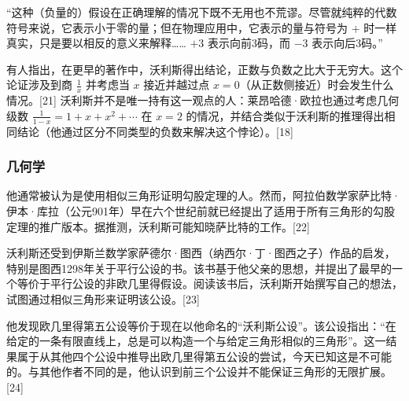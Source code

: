“这种（负量的）假设在正确理解的情况下既不无用也不荒谬。尽管就纯粹的代数符号来说，它表示小于零的量；但在物理应用中，它表示的量与符号为 \(+\) 时一样真实，只是要以相反的意义来解释…… \(+3\) 表示向前3码，而 \(-3\) 表示向后3码。”

有人指出，在更早的著作中，沃利斯得出结论，正数与负数之比大于无穷大。这个论证涉及到商 \(\frac{1}{x}\) 并考虑当 \(x\) 接近并越过点 \(x = 0\)（从正数侧接近）时会发生什么情况。[21] 沃利斯并不是唯一持有这一观点的人：莱昂哈德·欧拉也通过考虑几何级数 \(\frac{1}{1 - x} = 1 + x + x^2 + \cdots\) 在 \(x = 2\) 的情况，并结合类似于沃利斯的推理得出相同结论（他通过区分不同类型的负数来解决这个悖论）。[18]
\subsubsection{几何学}
他通常被认为是使用相似三角形证明勾股定理的人。然而，阿拉伯数学家萨比特·伊本·库拉（公元901年）早在六个世纪前就已经提出了适用于所有三角形的勾股定理的推广版本。据推测，沃利斯可能知晓萨比特的工作。[22]

沃利斯还受到伊斯兰数学家萨德尔·图西（纳西尔·丁·图西之子）作品的启发，特别是图西1298年关于平行公设的书。该书基于他父亲的思想，并提出了最早的一个等价于平行公设的非欧几里得假设。阅读该书后，沃利斯开始撰写自己的想法，试图通过相似三角形来证明该公设。[23]

他发现欧几里得第五公设等价于现在以他命名的“沃利斯公设”。该公设指出：“在给定的一条有限直线上，总是可以构造一个与给定三角形相似的三角形”。这一结果属于从其他四个公设中推导出欧几里得第五公设的尝试，今天已知这是不可能的。与其他作者不同的是，他认识到前三个公设并不能保证三角形的无限扩展。[24]